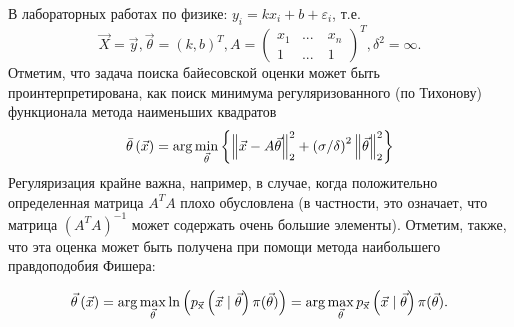 \begin{remark}

В лабораторных работах по физике: $y_{i} =kx_{i} +b+\varepsilon _{i} $, т.е.
\[\vec{X}=\vec{y}, \vec{\theta }=\left(k,b\right)^{T} , A=\left(\begin{array}{cc} {x_{1} } & {...\quad x_{n} } \\ {1} & {...\quad 1} \end{array}\right)^{T} , \delta ^{2} =\infty .\] 
Отметим,  что задача поиска байесовской оценки может быть проинтерпретирована, как поиск минимума регуляризованного (по Тихонову) функционала метода наименьших квадратов \[\bar{\theta }\left(\vec{x}\right)=\arg \mathop{\min }\limits_{\vec{\theta }} \left\{\left\| \vec{x}-A\vec{\theta }\right\| _{2}^{2} +\left({\sigma \mathord{\left/ {\vphantom {\sigma  \delta }} \right. \kern-\nulldelimiterspace} \delta } \right)^{2} \left\| \vec{\theta }\right\| _{2}^{2} \right\}\] Регуляризация крайне важна, например, в случае, когда положительно определенная матрица $A^{T} A$ плохо обусловлена (в частности, это означает, что матрица $\left(A^{T} A\right)^{-1} $ может содержать очень большие элементы). Отметим, также, что эта оценка может быть получена при помощи метода наибольшего правдоподобия Фишера: 

\[\vec{\theta }_{} \left(\vec{x}\right)=\arg \mathop{\max }\limits_{\vec{\theta }} \ln \left( p_{\vec{{\rm x}}} \left(\vec{x} \mid \vec{\theta }\right) \pi(\vec{\theta})\right) =\arg \mathop{\max }\limits_{\vec{\theta }} p_{\vec{{\rm x}}} \left(\vec{x} \mid \vec{\theta }\right) \pi(\vec{\theta}).\] 

\end{remark}


